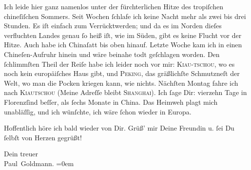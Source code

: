 \pstart
           Ich leide hier ganz namenlos unter der fürchterlichen Hitze des tropiſchen chineſiſchen Sommers. Seit
               Wochen{ }ſchlafe {\pb}ich keine Nacht mehr als zwei bis
               drei Stunden. Es iſt einfach zum Verrücktwerden; und da es im Norden dieſes
               verfluchten Landes genau{ }ſo
               heiß iſt, wie im Süden, gibt es keine Flucht vor der Hitze. Auch habe ich Chinaſatt bis oben hinauf. Letzte Woche kam ich
               in einen Chineſen-Aufruhr
               hinein und wäre beinahe todt geſchlagen worden. Den{ }ſchlimmſten Theil der Reiſe habe
               ich leider noch vor mir: \textsc{Kiau-tschou}, wo es noch kein europäiſches Haus gibt, und \textsc{Peking}, das gräßlichſte Schmutzneſt der {\pb}Welt, wo man
               die Pocken kriegen kann, wie nichts. Nächſten Montag
               fahre ich nach \textsc{Kiautschou} (Meine Adreſſe bleibt \textsc{Shanghai}). Ich{ }ſage Dir: vierzehn Tage in Florenzſind beſſer, als{ }ſechs Monate in China. Das
               Heimweh plagt mich unabläſſig, und ich wünſchte, ich wäre{ }ſchon wieder in Europa.\pend
           
\pstart
           Hoffentlich höre ich bald wieder von Dir. Grüß’ mir Deine Freundin u.{ }ſei Du{ }ſelbſt von Herzen
               gegrüßt!\pend
           
\pstart
           Dein treuer {\\[\baselineskip]}\spacefill\mbox{Paul Goldmann.}\pend
           \leftskip=0em{}\endnumbering{}  \newcommand{\dateiname}{L02853}\newcommand{\titel}{Paul Goldmann an Arthur Schnitzler, 21. 7. [1898]}\newcommand{\editorInnen}{Martin Anton Müller und Laura Untner}
